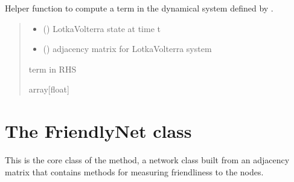 \documentclass[letterpaper,10pt,english]{sphinxmanual}
\begin{document}

\begin{fulllineitems}
\label{\detokenize{sensit:sensitivity.compute_j}}
\pysigstartsignatures
{}
\pysigstopsignatures
\sphinxAtStartPar
Helper function to compute a term in the dynamical system defined by {\hyperref[\detokenize{sensit:sensitivity.sense_kl}]{}}.
\begin{quote}\begin{description}
\begin{itemize}
\item {} 
\sphinxAtStartPar
{} (\sphinxstyleliteralemphasis{\sphinxupquote{{[}}}\sphinxstyleliteralemphasis{\sphinxupquote{{]}}}) \textendash{} Lotka\sphinxhyphen{}Volterra state at time t

\item {} 
\sphinxAtStartPar
{} (\sphinxstyleliteralemphasis{\sphinxupquote{{[}}}\sphinxstyleliteralemphasis{\sphinxupquote{{]}}}) \textendash{} adjacency matrix for Lotka\sphinxhyphen{}Volterra system

\end{itemize}

\sphinxAtStartPar
term in RHS

\sphinxAtStartPar
array{[}float{]}

\end{description}\end{quote}

\end{fulllineitems}


\sphinxstepscope


\chapter{The FriendlyNet class}
\label{\detokenize{friendlynets:the-friendlynet-class}}\label{\detokenize{friendlynets::doc}}
\sphinxAtStartPar
This is the core class of the method, a network class built from an adjacency matrix that contains methods for measuring friendliness to the nodes.
\end{document}
